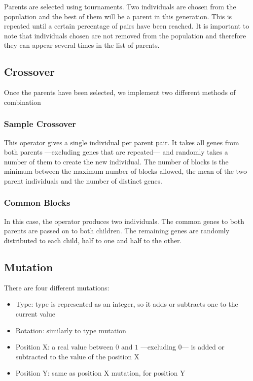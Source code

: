 Parents are selected using tournaments. Two individuals are chosen from the population and the best of them will be a parent in this generation. This is repeated until a certain percentage of pairs have been reached. It is important to note that individuals chosen are not removed from the population and therefore they can appear several times in the list of parents. 

\subsection{Crossover}

Once the parents have been selected, we implement two different methods of combination

\subsubsection{Sample Crossover}\label{ga:cross1}

This operator gives a single individual per parent pair. It takes all genes from both parents ---excluding genes that are repeated--- and randomly takes a number of them to create the new individual. The number of blocks is the minimum between the maximum number of blocks allowed, the mean of the two parent individuals and the number of distinct genes.

\subsubsection{Common Blocks}\label{ga:cross2}

In this case, the operator produces two individuals. The common genes to both parents are passed on to both children. The remaining genes are randomly distributed to each child, half to one and half to the other. 

\subsection{Mutation}\label{ga:mut}

There are four different mutations:

\begin{itemize}
	\item Type: type is represented as an integer, so it adds or subtracts one to the current value
	\item Rotation: similarly to type mutation
	\item Position X: a real value between $0$ and $1$ ---excluding $0$--- is added or subtracted to the value of the position X
	\item Position Y: same as position X mutation, for position Y
\end{itemize}

